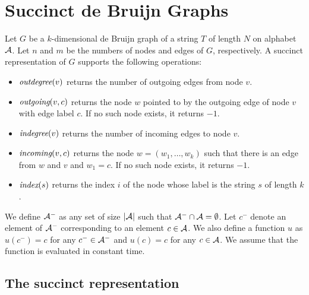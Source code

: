 
\section{Succinct de Bruijn Graphs}\label{p1-sec:sdg}

Let $G$ be a $k$-dimensional de Bruijn graph of a string $T$ of length $N$ on alphabet ${\cal A}$.
Let $n$ and $m$ be the numbers of nodes and edges of $G$, respectively.
A succinct representation of $G$ supports the following operations:
\begin{itemize}
\item ${\textit{outdegree}}(v)$ returns the number of outgoing edges from node $v$.
\item ${\textit{outgoing}}(v, c)$ returns the node $w$ pointed to by the outgoing edge of node $v$
with edge label $c$.  If no such node exists, it returns $-1$.
\item ${\textit{indegree}}(v)$ returns the number of incoming edges to node $v$.
\item ${\textit{incoming}}(v, c)$ returns the node $w = (w_1,\ldots,w_k)$ such that 
there is an edge from $w$ and $v$
and $w_1 = c$.  If no such node exists, it returns $-1$.
\item ${\textit{index}}(s)$ returns the index $i$ of the node whose label is the string $s$ of length $k$.
\end{itemize}

We define ${\cal A}^-$ as any set of size $|{\cal A}|$ such that ${\cal A}^- \cap {\cal A} = \emptyset$.
Let $c^-$ denote an element of ${\cal A}^-$ corresponding to an element $c \in {\cal A}$.
We also define a function $u$ as $u(c^-) = c$ for any $c^- \in {\cal A}^-$
and $u(c) = c$ for any $c \in {\cal A}$.  We assume that the function is evaluated in constant time.

\subsection{The succinct representation}

